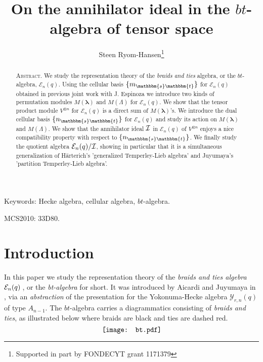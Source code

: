 \documentclass[10pt,a4,twoside,hidelinks,rm]{article}
\newcommand{\YY}{\mathcal{Y}_{r,n}(q)}
\newcommand\es{\mathbbm{s}}
\newcommand\et{\mathbbm{t}}
\newcommand{\E}{ {\mathcal E}_n(q)}
\newcommand\blambda{{\boldsymbol\lambda}}
\theoremstyle{plain}
\begin{document}
\title{\bf On the annihilator ideal in the $bt$-algebra of tensor space  }



\author{Steen Ryom-Hansen\thanks{Supported in part by FONDECYT grant 1171379  } }
\date{}   \maketitle


\begin{abstract}
\noindent \textsc{Abstract. }
We study the representation theory of the \textit{braids and ties} algebra,
or the $bt$-algebra, 
$ \E$.
Using the cellular basis $ \{ m_{\es\et} \} $ for $ \E$ obtained in previous joint work with
J. Espinoza we introduce two kinds of
permutation modules $ M(\blambda ) $ and $ M(\Lambda ) $ for $ \E$.
We show that the tensor product module $ V^{\otimes n } $ for $ \E $ is a direct sum of $ M(\blambda)$'s.
We introduce the dual cellular basis $ \{ n_{\es\et} \} $ for $ \E $ and study its action on
$ M(\blambda ) $ and $ M(\Lambda ) $.
We show that the annihilator ideal $ \cal I $ in $ \E $ of $ V^{\otimes n } $
enjoys a nice compatibility property with respect to 
$ \{ n_{\es\et} \} $.
We finally study the quotient algebra $ \E/\cal I $, showing in particular that it is a simultaneous generalization of
H\"arterich's 'generalized Temperley-Lieb
algebra' and Juyumaya's 'partition Temperley-Lieb algebra'.
\end{abstract}

\medskip
\noindent
Keywords: Hecke algebra, cellular algebra, $bt$-algebra.

\medskip
\noindent
MCS2010: 33D80.


\section{Introduction}


\medskip
In this paper we study the representation theory
of the \textit{braids and ties algebra} $ { \cal E}_{n}(q) \, $, or the \textit{bt-algebra} for short.
It was introduced by Aicardi and Juyumaya in \cite{AJ1}, via an \textit{abstraction} of the presentation 
for the Yokonuma-Hecke algebra $ \YY$ of type $ A_{n-1}$. The $bt$-algebra carries a diagrammatics
consisting of {\it braids and ties}, as illustrated below where braids are black
and ties are dashed red.
\begin{equation}\label{bt}
  \raisebox{-.45\height}{\texttt{[image: bt.pdf]}}
\end{equation}
\end{document}
